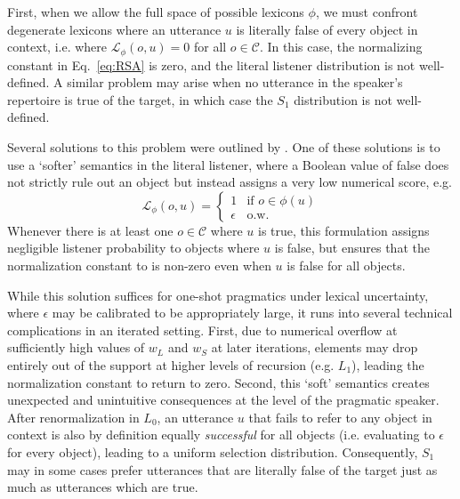\documentclass[11pt, floatsintext]{apa6}
\begin{document}
First, when we allow the full space of possible lexicons $\phi$, we must confront degenerate lexicons where an utterance $u$ is literally false of every object in context, i.e. where $\mathcal{L}_\phi(o, u) = 0$ for all $o\in \mathcal{C}$. 
In this case, the normalizing constant in Eq.~\ref{eq:RSA} is zero, and the literal listener distribution is not well-defined.
A similar problem may arise when no utterance in the speaker's repertoire is true of the target, in which case the $S_1$ distribution is not well-defined.

Several solutions to this problem were outlined by .
One of these solutions is to use a `softer' semantics in the literal listener, where a Boolean value of false does not strictly rule out an object but instead assigns a very low numerical score, e.g. 
$$\mathcal{L}_\phi(o,u) = \left\{ \begin{array} {rl} 1 & \textrm{if }o \in \phi(u) \\ \epsilon & \textrm{o.w.} \end{array}\right.$$
Whenever there is at least one $o\in\mathcal{C}$ where $u$ is true, this formulation assigns negligible listener probability to objects where $u$ is false, but ensures that the normalization constant to is non-zero even when $u$ is false for all objects.

While this solution suffices for one-shot pragmatics under lexical uncertainty, where $\epsilon$ may be calibrated to be appropriately large, it runs into several technical complications in an iterated setting.
First, due to numerical overflow at sufficiently high values of $w_L$ and $w_S$ at later iterations, elements may drop entirely out of the support at higher levels of recursion (e.g. $L_1$), leading the normalization constant to return to zero. 
Second, this `soft' semantics creates unexpected and unintuitive consequences at the level of the pragmatic speaker. 
After renormalization in $L_0$, an utterance $u$ that fails to refer to any object in context is also by definition equally \emph{successful} for all objects (i.e. evaluating to $\epsilon$ for every object), leading to a uniform selection distribution.
Consequently, $S_1$ may in some cases prefer utterances that are literally false of the target just as much as utterances which are true.
\end{document}
